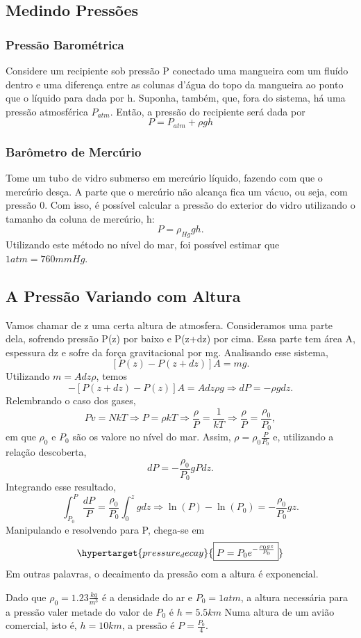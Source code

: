\documentclass[PhysicsII/physicsII_notes.tex]{subfiles}
\begin{document}
\subsection{Medindo Pressões}
\subsubsection{Pressão Barométrica}
Considere um recipiente sob pressão P conectado uma mangueira com um fluído dentro e uma diferença entre as colunas d'água
do topo da mangueira ao ponto que o líquido para dada por h. Suponha, também, que, fora do sistema, há uma pressão atmosférica \(P_{atm}\).
Então, a pressão do recipiente será dada por
\[
	P = P_{atm} + \rho gh
\]
\subsubsection{Barômetro de Mercúrio}
Tome um tubo de vidro submerso em mercúrio líquido, fazendo com que o mercúrio desça. A parte que o mercúrio não alcança fica um vácuo, ou seja, com pressão 0.
Com isso, é possível calcular a pressão do exterior do vidro utilizando o tamanho da coluna de mercúrio, h:
\[
	P = \rho_{Hg}gh.
\]
Utilizando este método no nível do mar, foi possível estimar que \(1atm = 760mmHg\).

\subsection{A Pressão Variando com Altura}
Vamos chamar de z uma certa altura de atmosfera. Consideramos uma parte dela, sofrendo pressão P(z) por baixo e P(z+dz) por cima. Essa parte tem área A, espessura dz e sofre
da força gravitacional por mg. Analisando esse sistema,
\[
	[P(z) - P(z+dz)]A = mg.
\]
Utilizando \(m = Adz\rho \), temos
\[
	-[P(z+dz)-P(z)]A = Adz\rho g \Rightarrow dP = -\rho g dz.
\]
Relembrando o caso dos gases,
\[
	Pv = NkT \Rightarrow P = \rho kT \Rightarrow \frac{\rho }{P} = \frac{1}{kT} \Rightarrow \frac{\rho }{P}=\frac{\rho_{0}}{P_{0}},
\]
em que \(\rho_{0}\) e \(P_{0}\) são os valore no nível do mar. Assim, \(\rho = \rho_{0} \frac{P}{P_{0}}\) e, utilizando a relação descoberta,
\[
	dP = -\frac{\rho_{0}}{P_{0}}gPdz.
\]
Integrando esse resultado,
\[
	\int_{P_{0}}^{P}\frac{dP}{P} = \frac{\rho_{0}}{P_{0}}\int_{0}^{z}gdz \Rightarrow \ln{(P)}-\ln{(P_{0})} = -\frac{\rho_{0}}{P_{0}}gz.
\]
Manipulando e resolvendo para P, chega-se em
\[
	\hypertarget{pressure_decay}{\boxed{P = P_{0}e^{-\frac{\rho_{0}gz}{P_{0}}}}}
\]
Em outras palavras, o decaimento da pressão com a altura é exponencial.
\begin{example}
	Dado que \(\rho_{0} = 1.23\frac{kg}{m^{3}}\) é a densidade do ar e \(P_{0} = 1atm\), a altura necessária para a pressão valer metade do valor de \(P_{0}\) é \(h = 5.5km\)
	Numa altura de um avião comercial, isto é, \(h=10km\), a pressão é \(P = \frac{P_{0}}{4}\).
\end{example}
\end{document}
